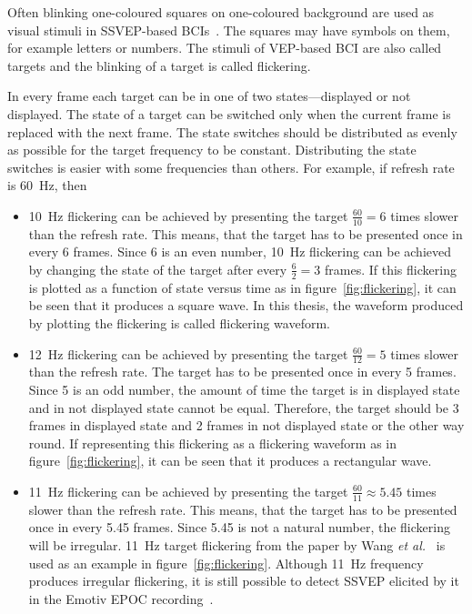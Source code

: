Often blinking one-coloured squares on one-coloured background are used as visual stimuli in \gls{SSVEP}-based \glspl{BCI}~\cite{ssvep_stim}. The squares may have symbols on them, for example letters or numbers. The stimuli of \gls{VEP}-based \gls{BCI} are also called \glspl{target} and the blinking of a \gls{target} is called \gls{flickering}.

In every \gls{frame} each \gls{target} can be in one of two \glspl{state}---displayed or not displayed. The \gls{state} of a \gls{target} can be switched only when the current \gls{frame} is replaced with the next \gls{frame}. The \gls{state} switches should be distributed as evenly as possible for the \gls{target} frequency to be constant. Distributing the \gls{state} switches is easier with some frequencies than others. For example, if \gls{refresh rate} is \SI{60}{Hz}, then
\begin{itemize}
	\item \SI{10}{Hz} \gls{flickering} can be achieved by presenting the \gls{target} $\frac{60}{10}=6$ times slower than the \gls{refresh rate}. This means, that the \gls{target} has to be presented once in every 6 \glspl{frame}. Since 6 is an even number, \SI{10}{Hz} \gls{flickering} can be achieved by changing the \gls{state} of the \gls{target} after every $\frac{6}{2} = 3$ \glspl{frame}. If this \gls{flickering} is plotted as a function of \gls{state} versus time as in figure~\ref{fig:flickering}, it can be seen that it produces a \gls{square wave}. In this thesis, the waveform produced by plotting the \gls{flickering} is called \gls{flickering waveform}.
	\item \SI{12}{Hz} \gls{flickering} can be achieved by presenting the \gls{target} $\frac{60}{12}=5$ times slower than the \gls{refresh rate}. The \gls{target} has to be presented once in every 5 \glspl{frame}. Since 5 is an odd number, the amount of time the \gls{target} is in displayed \gls{state} and in not displayed \gls{state} cannot be equal. Therefore, the \gls{target} should be 3 \glspl{frame} in displayed \gls{state} and 2 \glspl{frame} in not displayed \gls{state} or the other way round. If representing this \gls{flickering} as a \gls{flickering waveform} as in figure~\ref{fig:flickering}, it can be seen that it produces a \gls{rectangular wave}.
	\item \SI{11}{Hz} \gls{flickering} can be achieved by presenting the \gls{target} $\frac{60}{11}\approx 5.45$ times slower than the \gls{refresh rate}. This means, that the \gls{target} has to be presented once in every 5.45 \glspl{frame}. Since 5.45 is not a natural number, the \gls{flickering} will be irregular. \SI{11}{Hz} target \gls{flickering} from the paper by Wang \textit{et al.}~\cite{11hz} is used as an example in figure~\ref{fig:flickering}. Although \SI{11}{Hz} frequency produces irregular \gls{flickering}, it is still possible to detect \gls{SSVEP} elicited by it in the Emotiv EPOC recording~\cite{emotiv_11hz}.
\end{itemize}

